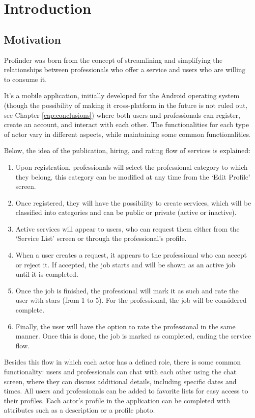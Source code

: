 \chapter*{Introduction}
\label{cap:introduction}
\section*{Motivation}
Profinder was born from the concept of streamlining and simplifying the relationships between professionals who offer a service and users who are willing to consume it.

It's a mobile application, initially developed for the Android operating system (though the possibility of making it cross-platform in the future is not ruled out, see Chapter \ref{cap:conclusions}) where both users and professionals can register, create an account, and interact with each other. The functionalities for each type of actor vary in different aspects, while maintaining some common functionalities.

Below, the idea of the publication, hiring, and rating flow of services is explained:
\begin{enumerate}
	\item Upon registration, professionals will select the professional category to which they belong, this category can be modified at any time from the ‘Edit Profile’ screen.
	\item Once registered, they will have the possibility to create services, which will be classified into categories and can be public or private (active or inactive).
	\item Active services will appear to users, who can request them either from the ‘Service List’ screen or through the professional's profile.
	\item When a user creates a request, it appears to the professional who can accept or reject it. If accepted, the job starts and will be shown as an active job until it is completed.
	\item Once the job is finished, the professional will mark it as such and rate the user with stars (from 1 to 5). For the professional, the job will be considered complete.
	\item Finally, the user will have the option to rate the professional in the same manner. Once this is done, the job is marked as completed, ending the service flow.
\end{enumerate}
Besides this flow in which each actor has a defined role, there is some common functionality: users and professionals can chat with each other using the chat screen, where they can discuss additional details, including specific dates and times. All users and professionals can be added to favorite lists for easy access to their profiles. Each actor's profile in the application can be completed with attributes such as a description or a profile photo.

